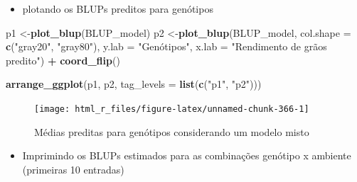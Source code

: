 \documentclass[
]{book}
\newenvironment{Shaded}{\begin{snugshade}}{\end{snugshade}}
\newcommand{\DataTypeTok}[1]{\textcolor[rgb]{0.13,0.29,0.53}{#1}}
\newcommand{\KeywordTok}[1]{\textcolor[rgb]{0.13,0.29,0.53}{\textbf{#1}}}
\newcommand{\NormalTok}[1]{#1}
\newcommand{\OperatorTok}[1]{\textcolor[rgb]{0.81,0.36,0.00}{\textbf{#1}}}
\newcommand{\StringTok}[1]{\textcolor[rgb]{0.31,0.60,0.02}{#1}}
\providecommand{\tightlist}{%
  \setlength{\itemsep}{0pt}\setlength{\parskip}{0pt}}
\numberwithin{equation}{section}
\begin{document}
\begin{itemize}
\tightlist
\item
  plotando os BLUPs preditos para genótipos
\end{itemize}

\begin{Shaded}
\begin{Highlighting}[]
\NormalTok{p1 \textless{}{-}}\KeywordTok{plot\_blup}\NormalTok{(BLUP\_model)}
\NormalTok{p2 \textless{}{-}}\KeywordTok{plot\_blup}\NormalTok{(BLUP\_model,}
               \DataTypeTok{col.shape  =}  \KeywordTok{c}\NormalTok{(}\StringTok{"gray20"}\NormalTok{, }\StringTok{"gray80"}\NormalTok{),}
               \DataTypeTok{y.lab =} \StringTok{"Genótipos"}\NormalTok{,}
               \DataTypeTok{x.lab =} \StringTok{"Rendimento de grãos predito"}\NormalTok{) }\OperatorTok{+}\StringTok{ }\KeywordTok{coord\_flip}\NormalTok{()}

\KeywordTok{arrange\_ggplot}\NormalTok{(p1, p2, }\DataTypeTok{tag\_levels =} \KeywordTok{list}\NormalTok{(}\KeywordTok{c}\NormalTok{(}\StringTok{"p1"}\NormalTok{, }\StringTok{"p2"}\NormalTok{)))}
\end{Highlighting}
\end{Shaded}

\begin{figure}

{\centering \texttt{[image: html\_r\_files/figure-latex/unnamed-chunk-366-1]} 

}

\caption{Médias preditas para genótipos considerando um modelo misto}\label{fig:unnamed-chunk-366}
\end{figure}

\begin{itemize}
\tightlist
\item
  Imprimindo os BLUPs estimados para as combinações genótipo x ambiente (primeiras 10 entradas)
\end{itemize}
\end{document}
